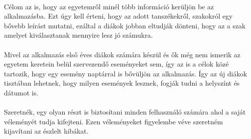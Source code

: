 	\paragraph{}
	Célom az is, hogy az egyetemről minél több információ kerüljön be az alkalmazásba. Ezt úgy kell érteni, hogy az adott tanszékekről, szakokról egy bővebb leírást mutatni, ezáltal a diákok jobban eltudják dönteni, hogy az a szak amelyet kiválasztanak mennyire lesz jó számukra.
	\paragraph{}
	Mivel az alkalmazás első éves diákok számára készül és ők még nem ismerik az egyetem keretein belül szervezendő eseményeket sem, így az is a célok közé tartozik, hogy egy esemény naptárral is bővüljön az alkalmazás. Így az új diákok tisztában lehetnek, hogy milyen események lesznek, fogják tudni a helyszínt és dátumot is.
	\paragraph{}
	Szeretnék, egy olyan részt is biztosítani minden felhasználó számára ahol a saját véleményét tudja kifejteni. Ezen véleményeket figyelembe véve szeretném kijavítani az észlelt hibákat.